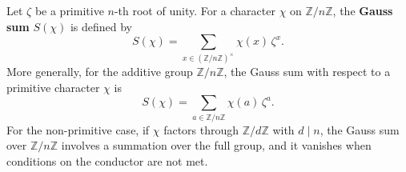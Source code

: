 Let $\zeta$ be a primitive $n$-th root of unity. For a character $\chi$ on $\mathbb{Z}/n\mathbb{Z}$, the \textbf{Gauss sum} $S(\chi)$ is defined by
$$S(\chi) = \sum_{x \in (\mathbb{Z}/n\mathbb{Z})^\times} \chi(x) \, \zeta^x.$$
More generally, for the additive group $\mathbb{Z}/n\mathbb{Z}$, the Gauss sum with respect to a primitive character $\chi$ is
$$S(\chi) = \sum_{a \in \mathbb{Z}/n\mathbb{Z}} \chi(a) \, \zeta^a.$$
For the non-primitive case, if $\chi$ factors through $\mathbb{Z}/d\mathbb{Z}$ with $d \mid n$, the Gauss sum over $\mathbb{Z}/n\mathbb{Z}$ involves a summation over the full group, and it vanishes when conditions on the conductor are not met.
